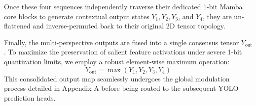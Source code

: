 \documentclass[journal]{IEEEtran}
\begin{document}
Once these four sequences independently traverse their dedicated 1-bit Mamba core blocks to generate contextual output states $Y_1, Y_2, Y_3$, and $Y_4$, they are un-flattened and inverse-permuted back to their original 2D tensor topology. 

Finally, the multi-perspective outputs are fused into a single consensus tensor $Y_{\text{out}}$. To maximize the preservation of salient feature activations under severe 1-bit quantization limits, we employ a robust element-wise maximum operation:
\begin{equation}
    Y_{\text{out}} = \max(Y_1, Y_2, Y_3, Y_4)
\end{equation}
This consolidated output map seamlessly undergoes the global modulation process detailed in Appendix A before being routed to the subsequent YOLO prediction heads.
\end{document}
